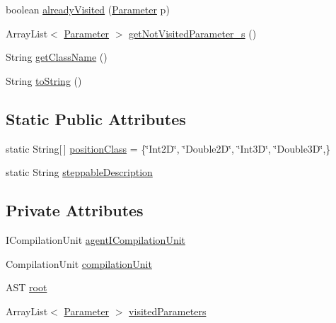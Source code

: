 \begin{DoxyCompactItemize}
\item 
boolean \hyperlink{classit_1_1isislab_1_1masonassisteddocumentation_1_1mason_1_1analizer_1_1_agent_analizer_a3e5ea2154f20535f5bd33db685cf045c}{already\-Visited} (\hyperlink{classit_1_1isislab_1_1masonassisteddocumentation_1_1mason_1_1analizer_1_1_parameter}{Parameter} p)
\item 
Array\-List$<$ \hyperlink{classit_1_1isislab_1_1masonassisteddocumentation_1_1mason_1_1analizer_1_1_parameter}{Parameter} $>$ \hyperlink{classit_1_1isislab_1_1masonassisteddocumentation_1_1mason_1_1analizer_1_1_agent_analizer_ad237f6e49d6d49e0138b1e2ac6a2b0bb}{get\-Not\-Visited\-Parameter\-\_\-s} ()
\item 
String \hyperlink{classit_1_1isislab_1_1masonassisteddocumentation_1_1mason_1_1analizer_1_1_agent_analizer_a94492199c5e4873a07a2a46d15617937}{get\-Class\-Name} ()
\item 
String \hyperlink{classit_1_1isislab_1_1masonassisteddocumentation_1_1mason_1_1analizer_1_1_agent_analizer_aa1e783609d0c0ffbb244ba4c22abc7b9}{to\-String} ()
\end{DoxyCompactItemize}
\subsection*{Static Public Attributes}
\begin{DoxyCompactItemize}
\item 
static String\mbox{[}$\,$\mbox{]} \hyperlink{classit_1_1isislab_1_1masonassisteddocumentation_1_1mason_1_1analizer_1_1_agent_analizer_aea5eff658e91428950dd0efd1339bf36}{position\-Class} = \{\char`\"{}Int2\-D\char`\"{}, \char`\"{}Double2\-D\char`\"{}, \char`\"{}Int3\-D\char`\"{}, \char`\"{}Double3\-D\char`\"{},\}
\item 
static String \hyperlink{classit_1_1isislab_1_1masonassisteddocumentation_1_1mason_1_1analizer_1_1_agent_analizer_a5c6d63f226ee1dc2a0749c6a5ee40dd9}{steppable\-Description}
\end{DoxyCompactItemize}
\subsection*{Private Attributes}
\begin{DoxyCompactItemize}
\item 
I\-Compilation\-Unit \hyperlink{classit_1_1isislab_1_1masonassisteddocumentation_1_1mason_1_1analizer_1_1_agent_analizer_ab0d7780b5d7b3607251116bf7bcde320}{agent\-I\-Compilation\-Unit}
\item 
Compilation\-Unit \hyperlink{classit_1_1isislab_1_1masonassisteddocumentation_1_1mason_1_1analizer_1_1_agent_analizer_aad9b5d0882694d2802dc24c982f21985}{compilation\-Unit}
\item 
A\-S\-T \hyperlink{classit_1_1isislab_1_1masonassisteddocumentation_1_1mason_1_1analizer_1_1_agent_analizer_a83430d48ecbe1fc48d0cd8f10c2d99a8}{root}
\item 
Array\-List$<$ \hyperlink{classit_1_1isislab_1_1masonassisteddocumentation_1_1mason_1_1analizer_1_1_parameter}{Parameter} $>$ \hyperlink{classit_1_1isislab_1_1masonassisteddocumentation_1_1mason_1_1analizer_1_1_agent_analizer_aee5454eb7063c444081bdb2556d3a60b}{visited\-Parameters}
\end{DoxyCompactItemize}
